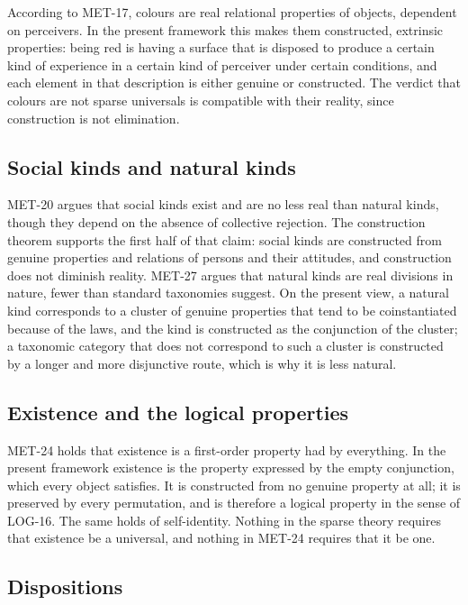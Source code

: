 \documentclass{situationist-preprint}
\begin{document}
According to MET-17, colours are real relational properties of objects, dependent on perceivers. In the present framework this makes them constructed, extrinsic properties: being red is having a surface that is disposed to produce a certain kind of experience in a certain kind of perceiver under certain conditions, and each element in that description is either genuine or constructed. The verdict that colours are not sparse universals is compatible with their reality, since construction is not elimination.

\subsection{Social kinds and natural kinds}

MET-20 argues that social kinds exist and are no less real than natural kinds, though they depend on the absence of collective rejection. The construction theorem supports the first half of that claim: social kinds are constructed from genuine properties and relations of persons and their attitudes, and construction does not diminish reality. MET-27 argues that natural kinds are real divisions in nature, fewer than standard taxonomies suggest. On the present view, a natural kind corresponds to a cluster of genuine properties that tend to be coinstantiated because of the laws, and the kind is constructed as the conjunction of the cluster; a taxonomic category that does not correspond to such a cluster is constructed by a longer and more disjunctive route, which is why it is less natural.

\subsection{Existence and the logical properties}

MET-24 holds that existence is a first-order property had by everything. In the present framework existence is the property expressed by the empty conjunction, which every object satisfies. It is constructed from no genuine property at all; it is preserved by every permutation, and is therefore a logical property in the sense of LOG-16. The same holds of self-identity. Nothing in the sparse theory requires that existence be a universal, and nothing in MET-24 requires that it be one.

\subsection{Dispositions}
\end{document}
